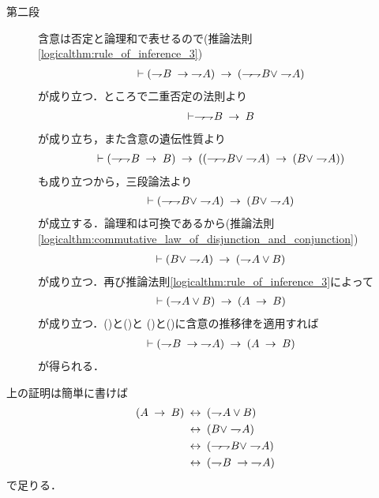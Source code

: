 \begin{prf}
\begin{description}
			\item[第二段]
				含意は否定と論理和で表せるので(推論法則\ref{logicalthm:rule_of_inference_3})
				\begin{align}
					\vdash (\negation B \rarrow \negation A)
					\rarrow (\negation \negation B \vee \negation A)
					\label{eq:thm_contraposition_is_true_5}
				\end{align}
				が成り立つ．ところで二重否定の法則より
				\begin{align}
					\vdash \negation \negation B \rarrow B
				\end{align}
				が成り立ち，また含意の遺伝性質より
				\begin{align}
					\vdash (\negation \negation B \rarrow B)
					\rarrow ((\negation \negation B \vee \negation A)
					\rarrow (B \vee \negation A))
				\end{align}
				も成り立つから，三段論法より
				\begin{align}
					\vdash (\negation \negation B \vee \negation A)
					\rarrow (B \vee \negation A)
					\label{eq:thm_contraposition_is_true_6}
				\end{align}
				が成立する．論理和は可換であるから(推論法則\ref{logicalthm:commutative_law_of_disjunction_and_conjunction})
				\begin{align}
					\vdash (B \vee \negation A) \rarrow (\negation A \vee B)
					\label{eq:thm_contraposition_is_true_7}
				\end{align}
				が成り立つ．再び推論法則\ref{logicalthm:rule_of_inference_3}によって
				\begin{align}
					\vdash (\negation A \vee B)
					\rarrow (A \rarrow B)
					\label{eq:thm_contraposition_is_true_8}
				\end{align}
				が成り立つ．()と()と
				()と()に含意の推移律を適用すれば
				\begin{align}
					\vdash (\negation B \rarrow \negation A) \rarrow (A \rarrow B)
				\end{align}
				が得られる．
				\QED
		\end{description}
	\end{prf}
	
	上の証明は簡単に書けば
	\begin{align}
		(A \rarrow B) &\lrarrow (\negation A \vee B) \\
		&\lrarrow (B \vee \negation A) \\
		&\lrarrow (\negation \negation B \vee \negation A) \\
		&\lrarrow (\negation B \rarrow \negation A)
	\end{align}
	で足りる．
	
